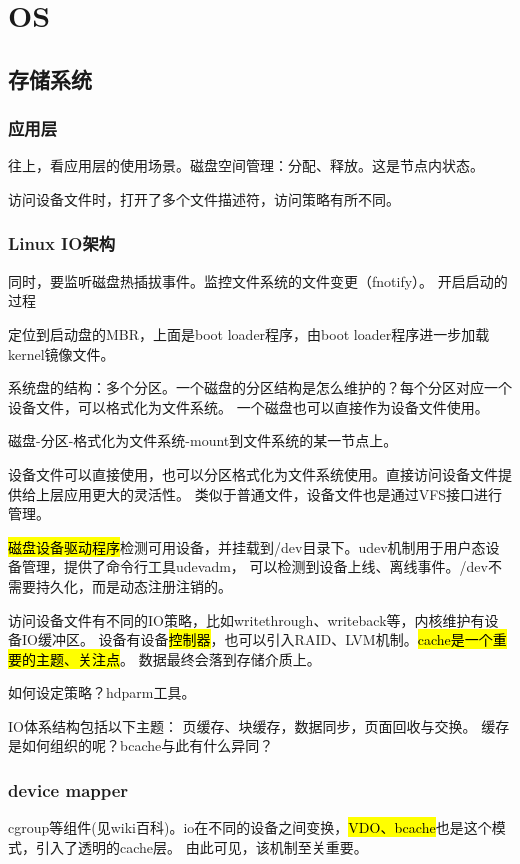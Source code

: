 \chapter{OS}

\section{存储系统}

\subsection{应用层}

往上，看应用层的使用场景。磁盘空间管理：分配、释放。这是节点内状态。

访问设备文件时，打开了多个文件描述符，访问策略有所不同。

\subsection{Linux IO架构}

同时，要监听磁盘热插拔事件。监控文件系统的文件变更（fnotify）。
开启启动的过程

定位到启动盘的MBR，上面是boot loader程序，由boot loader程序进一步加载kernel镜像文件。

系统盘的结构：多个分区。一个磁盘的分区结构是怎么维护的？每个分区对应一个设备文件，可以格式化为文件系统。
一个磁盘也可以直接作为设备文件使用。

磁盘-分区-格式化为文件系统-mount到文件系统的某一节点上。

设备文件可以直接使用，也可以分区格式化为文件系统使用。直接访问设备文件提供给上层应用更大的灵活性。
类似于普通文件，设备文件也是通过VFS接口进行管理。

\hl{磁盘设备驱动程序}检测可用设备，并挂载到/dev目录下。udev机制用于用户态设备管理，提供了命令行工具udevadm，
可以检测到设备上线、离线事件。/dev不需要持久化，而是动态注册注销的。

访问设备文件有不同的IO策略，比如writethrough、writeback等，内核维护有设备IO缓冲区。
设备有设备\hl{控制器}，也可以引入RAID、LVM机制。\hl{cache是一个重要的主题、关注点}。
数据最终会落到存储介质上。

如何设定策略？hdparm工具。

IO体系结构包括以下主题： 页缓存、块缓存，数据同步，页面回收与交换。
缓存是如何组织的呢？bcache与此有什么异同？

\subsection{device mapper}

cgroup等组件(见wiki百科)。io在不同的设备之间变换，\hl{VDO、bcache}也是这个模式，引入了透明的cache层。
由此可见，该机制至关重要。
